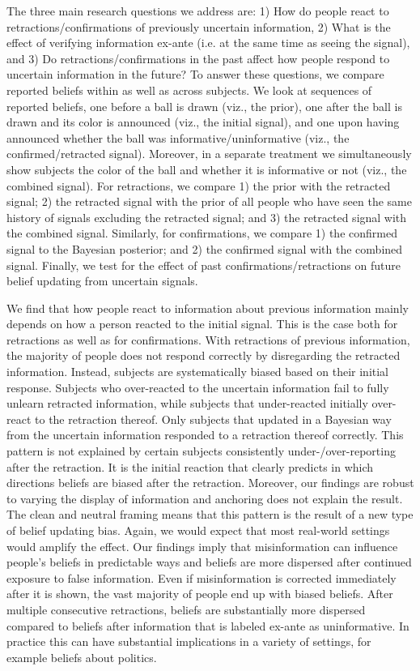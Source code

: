 \documentclass{article}
\begin{document}
The three main research questions we address are: 1) How do people react to retractions/confirmations of previously uncertain information, 2) What is the effect of verifying information ex-ante (i.e. at the same time as seeing the signal), and 3) Do retractions/confirmations in the past affect how people respond to uncertain information in the future? To answer these questions, we compare reported beliefs within as well as across subjects. We look at sequences of reported beliefs, one before a ball is drawn (viz., the prior), one after the ball is drawn and its color is announced (viz., the initial signal), and one upon having announced whether the ball was informative/uninformative (viz., the confirmed/retracted signal). Moreover, in a separate treatment we simultaneously show subjects the color of the ball and whether it is informative or not (viz., the combined signal). For retractions, we compare 1) the prior with the retracted signal; 2) the retracted signal with the prior of all people who have seen the same history of signals excluding the retracted signal; and 3) the retracted signal with the combined signal. Similarly, for confirmations, we compare 1) the confirmed signal to the Bayesian posterior; and 2) the confirmed signal with the combined signal. Finally, we test for the effect of past confirmations/retractions on future belief updating from uncertain signals.

We find that how people react to information about previous information mainly depends on how a person reacted to the initial signal. This is the case both for retractions as well as for confirmations. With retractions of previous information, the majority of people does not respond correctly by disregarding the retracted information. Instead, subjects are systematically biased based on their initial response. Subjects who over-reacted to the uncertain information fail to fully unlearn retracted information, while subjects that under-reacted initially over-react to the retraction thereof. Only subjects that updated in a Bayesian way from the uncertain information responded to a retraction thereof correctly. This pattern is not explained by certain subjects consistently under-/over-reporting after the retraction. It is the initial reaction that clearly predicts in which directions beliefs are biased after the retraction. Moreover, our findings are robust to varying the display of information and anchoring does not explain the result. The clean and neutral framing means that this pattern is the result of a new type of belief updating bias. Again, we would expect that most real-world settings would amplify the effect. Our findings imply that misinformation can influence people's beliefs in predictable ways and beliefs are more dispersed after continued exposure to false information. Even if misinformation is corrected immediately after it is shown, the vast majority of people end up with biased beliefs. After multiple consecutive retractions, beliefs are substantially more dispersed compared to beliefs after information that is labeled ex-ante as uninformative. In practice this can have substantial implications in a variety of settings, for example beliefs about politics.
\end{document}
